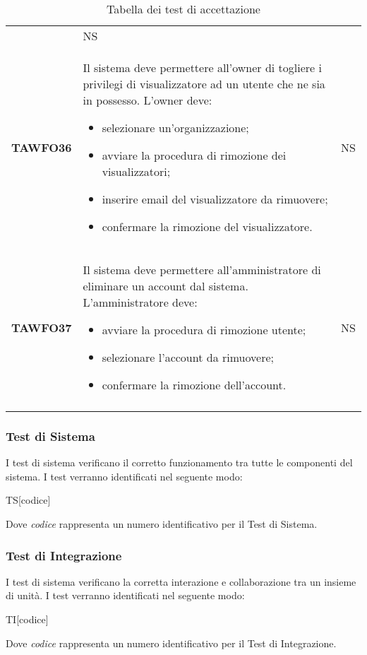 \documentclass[../piano-di-qualifica.tex]{subfiles}
\begin{document}
\begin{centering}
\begin{longtable}[H]{>{\centering\bfseries}m{3cm} >{}p{10cm} >{\centering\arraybackslash}m{3cm}}
\begin{itemize}
        \end{itemize}
        & NS \\
        TAWFO36      & Il sistema deve permettere all’owner di togliere i privilegi di visualizzatore ad un utente che ne sia in possesso. \newline
        L'owner deve:
        \begin{itemize}
         \item selezionare un'organizzazione;
         \item avviare la procedura di rimozione dei visualizzatori;
         \item inserire email del visualizzatore da rimuovere;
         \item confermare la rimozione del visualizzatore.
        \end{itemize}
        & NS \\
        TAWFO37      & Il sistema deve permettere all’amministratore di eliminare un account dal sistema. \newline
        L'amministratore deve:
        \begin{itemize}
         \item avviare la procedura di rimozione utente;
         \item selezionare l'account da rimuovere;
         \item confermare la rimozione dell'account.
        \end{itemize}
        & NS \\
        \caption{Tabella dei test di accettazione}%
        \label{tab:test_accettazione}
      \end{longtable}
    \end{centering}
    \subsubsection{Test di Sistema}%
  \label{subs:sistema}
    I test di sistema verificano il corretto funzionamento tra tutte le componenti del sistema. I test verranno identificati nel seguente modo:
    \begin{center}
      TS[codice]
    \end{center}
    Dove \textit{codice} rappresenta un numero identificativo per il Test di Sistema.
  \subsubsection{Test di Integrazione}%
  \label{subs:integrazione}
    I test di sistema verificano la corretta interazione e collaborazione tra un insieme di unità. I test verranno identificati nel seguente modo:
    \begin{center}
      TI[codice]
    \end{center}
    Dove \textit{codice} rappresenta un numero identificativo per il Test di Integrazione.
\end{document}
